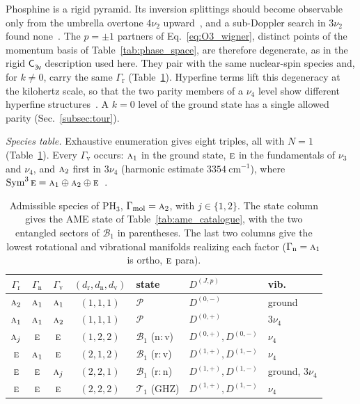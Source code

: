 \documentclass[
  reprint,
  aps,
  prx,
  superscriptaddress,
  amsmath,
  amssymb,
  longbibliography
]{revtex4-2}
\newcommand{\grp}[1]{\mathsf{#1}}
\newcommand{\irr}[1]{\text{\normalfont\scshape #1}}
\newcommand{\irrJp}[2]{D^{(#1,#2)}}
\newcommand{\parity}{p}               %
\providecommand{\Gmol}{\Gamma_{\mathrm{mol}}}
\providecommand{\Grot}{\Gamma_{\mathrm{r}}}
\providecommand{\Gvib}{\Gamma_{\mathrm{v}}}
\providecommand{\Gspin}{\Gamma_{\mathrm{n}}}
\newcommand{\catP}{\mathcal{P}}
\newcommand{\catB}[1]{\mathcal{B}_{#1}}
\newcommand{\catT}[1]{\mathcal{T}_{#1}}
\begin{document}
Phosphine is a rigid pyramid. Its inversion splittings should become observable only from the umbrella overtone $4\nu_2$ upward~\cite{SousaSilva2016}, and a sub-Doppler search in $3\nu_2$ found none~\cite{OkudaSasada2018}. The $\parity=\pm1$ partners of Eq.~\eqref{eq:O3_wigner}, distinct points of the momentum basis of Table~\ref{tab:phase_space}, are therefore degenerate, as in the rigid $\grp{C_{3v}}$ description used here. They pair with the same nuclear-spin species and, for $k\neq0$, carry the same $\Grot$ (Table~\ref{tab:ammonia_species}). Hyperfine terms lift this degeneracy at the kilohertz scale, so that the two parity members of a $\nu_4$ level show different hyperfine structures~\cite{Butcher1993, Pfister1996}. A $k=0$ level of the ground state has a single allowed parity (Sec.~\ref{subsec:tour}).

\emph{Species table.} Exhaustive enumeration gives eight triples, all with $N=1$ (Table~\ref{tab:ammonia_species}). Every $\Gvib$ occurs: $\irr{a}_{1}$ in the ground state, $\irr{e}$ in the fundamentals of $\nu_3$ and $\nu_4$, and $\irr{a}_{2}$ first in $3\nu_4$ (harmonic estimate $3354\ \mathrm{cm^{-1}}$), where $\operatorname{Sym}^{3}\irr{e}=\irr{a}_{1}\oplus \irr{a}_{2}\oplus \irr{e}$~\cite{o3harmonics}.

\begin{table}[h]
\caption{Admissible species of $\mathrm{PH_3}$, $\Gmol=\irr{a}_{2}$, with $j\in\{1,2\}$. The state column gives the AME state of Table~\ref{tab:ame_catalogue}, with the two entangled sectors of $\catB{1}$ in parentheses. The last two columns give the lowest rotational and vibrational manifolds realizing each factor ($\Gspin=\irr{a}_{1}$ is ortho, $\irr{e}$ para).}
\label{tab:ammonia_species}
\centering
\begin{tabular}{cccclll}
\toprule
$\Grot$ & $\Gspin$ & $\Gvib$ & $(d_{\mathrm{r}},d_{\mathrm{n}},d_{\mathrm{v}})$ & state & $\irrJp{J}{\parity}$ & vib.\\
\midrule
$\irr{a}_{2}$ & $\irr{a}_{1}$ & $\irr{a}_{1}$ & $(1,1,1)$ & $\catP$ & $\irrJp{0}{-}$ & ground\\
$\irr{a}_{1}$ & $\irr{a}_{1}$ & $\irr{a}_{2}$ & $(1,1,1)$ & $\catP$ & $\irrJp{0}{+}$ & $3\nu_4$\\
$\irr{a}_{j}$ & $\irr{e}$   & $\irr{e}$   & $(1,2,2)$ & $\catB{1}$ ($\mathrm{n\!:\!v}$) & $\irrJp{0}{+},\irrJp{0}{-}$ & $\nu_4$\\
$\irr{e}$   & $\irr{a}_{1}$ & $\irr{e}$   & $(2,1,2)$ & $\catB{1}$ ($\mathrm{r\!:\!v}$) & $\irrJp{1}{+},\irrJp{1}{-}$ & $\nu_4$\\
$\irr{e}$   & $\irr{e}$   & $\irr{a}_{j}$ & $(2,2,1)$ & $\catB{1}$ ($\mathrm{r\!:\!n}$) & $\irrJp{1}{+},\irrJp{1}{-}$ & ground, $3\nu_4$\\
$\irr{e}$   & $\irr{e}$   & $\irr{e}$   & $(2,2,2)$ & $\catT{1}$ (GHZ) & $\irrJp{1}{+},\irrJp{1}{-}$ & $\nu_4$\\
\bottomrule
\end{tabular}
\end{table}
\end{document}
